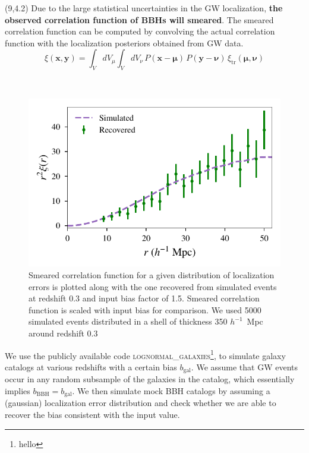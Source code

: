 \documentclass[a1,portrait]{a1poster}
\newcommand{\headingcolor}{\color{BannerElevenColor}}
\newcommand{\x}{\mathbf{x}}
\newcommand{\y}{\mathbf{y}}
\newcommand{\xit}{\xi_\mathrm{tr}}
\newcommand{\bmu}{\bm \mu}
\newcommand{\bnu}{\bm \nu}
\def\LHead#1{\noindent{\LARGE \headingcolor #1}\smallskip}
\begin{document}
\begin{textblock}{7}(9,4.2)	%
\vspace{2cm}
Due to the large statistical uncertainties in the GW localization, \textbf{the observed correlation function of BBHs will smeared}. The smeared correlation function can be computed by convolving the actual correlation function with the localization posteriors obtained from GW data.
\begin{equation}
\xi(\x, \y) = \int_V dV_\mu \int_V dV_\nu \,  P(\x-\bmu) \, P(\y-\bnu) \, \xit(\bmu, \bnu)
\label{eq:xi_v2}
\end{equation}

\LHead{Simulations and Results}\\
\begin{figure}[t]
	\centering
	\includegraphics[scale=1.6]{comparison_data_expected.pdf}
	\caption{\small{Smeared correlation function for a given distribution of localization errors is plotted along with the one recovered from simulated events at redshift 0.3 and input bias factor of 1.5. Smeared correlation function is scaled with input bias for comparison. We used 5000 simulated events distributed in a shell of thickness 350 $h^{-1}$~Mpc around redshift $0.3$} }
	\label{fig:simulation_example}
\end{figure}
We use the publicly available code \textsc{lognormal\_galaxies}\footnote{hello}, to simulate galaxy catalogs at various redshifts with a certain bias $ b_\mathrm{gal} $. We assume that GW events occur in any random subsample of the galaxies in the catalog, which essentially implies $b_\mathrm{BBH}=b_\mathrm{gal}$. We then simulate mock BBH catalogs by assuming a (gaussian) localization error distribution and check whether we are able to recover the bias consistent with the input value.\\


\end{textblock}
\end{document}
